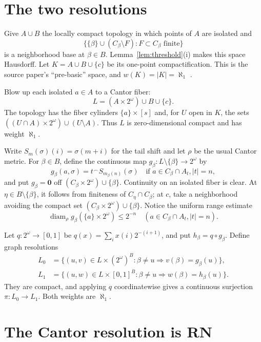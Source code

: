 \documentclass[11pt]{article}
\newcommand{\concat}{\mathbin{{}^\frown}}
\begin{document}
\section{The two resolutions}

Give $A\cup B$ the locally compact topology in which points of $A$ are isolated
and
\[
 \bigl\{\{\beta\}\cup(C_\beta\setminus F):F\subset C_\beta\text{ finite}\bigr\}
\]
is a neighborhood base at $\beta\in B$.  Lemma~\ref{lem:threshold}(i) makes
this space Hausdorff.  Let $K=A\cup B\cup\{c\}$ be its one-point
compactification.  This is the source paper's ``pre-basic'' space, and
$w(K)=|K|=\aleph_1$ \cite[Lemma 2.3]{MC}.

Blow up each isolated $a\in A$ to a Cantor fiber:
\[
                  L=(A\times2^\omega)\cup B\cup\{c\}.
\]
The topology has the fiber cylinders $\{a\}\times[s]$ and, for $U$ open in
$K$, the sets $((U\cap A)\times2^\omega)\cup(U\setminus A)$.  Thus $L$ is
zero-dimensional compact and has weight $\aleph_1$.

Write $S_m(\sigma)(i)=\sigma(m+i)$ for the tail shift and let
$\rho$ be the usual Cantor metric.  For $\beta\in B$, define the continuous
map $g_\beta:L\setminus\{\beta\}\to2^\omega$ by
\[
 g_\beta(a,\sigma)=t\concat S_{m_\beta(n)}(\sigma)
 \quad\text{if }a\in C_\beta\cap A_t, |t|=n,
\tag{3}
\]
and put $g_\beta=\mathbf 0$ off $(C_\beta\times2^\omega)\cup\{\beta\}$.
Continuity on an isolated fiber is clear.  At $\eta\in B\setminus\{\beta\}$,
it follows from finiteness of $C_\eta\cap C_\beta$; at $c$, take a neighborhood
avoiding the compact set $(C_\beta\times2^\omega)\cup\{\beta\}$.  Notice the
uniform range estimate
\[
 \operatorname{diam}_\rho g_\beta(\{a\}\times2^\omega)\le 2^{-n}
 \quad(a\in C_\beta\cap A_t, |t|=n).
\tag{4}
\]

Let $q:2^\omega\to[0,1]$ be
$q(x)=\sum_i x(i)2^{-(i+1)}$, and put $h_\beta=q\circ g_\beta$.  Define graph
resolutions
\begin{align*}
L_0&=\{(u,v)\in L\times(2^\omega)^B:
       \beta\ne u\Rightarrow v(\beta)=g_\beta(u)\},\\
L_1&=\{(u,w)\in L\times[0,1]^B:
       \beta\ne u\Rightarrow w(\beta)=h_\beta(u)\}.
\end{align*}
They are compact, and applying $q$ coordinatewise gives a continuous
surjection $\pi:L_0\to L_1$.  Both weights are $\aleph_1$.

\section{The Cantor resolution is RN}
\end{document}
